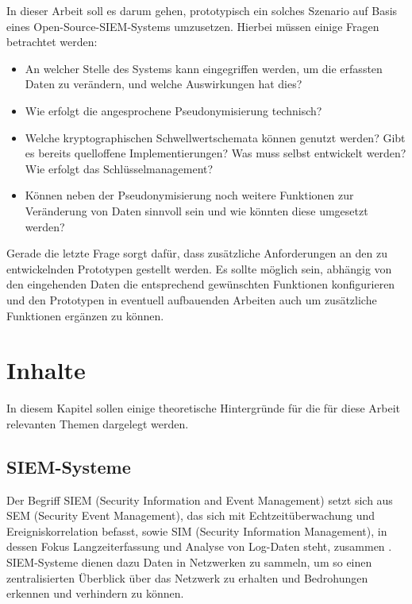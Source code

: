 \documentclass[
    fontsize=12pt,
    headings=small,
    parskip=half,           %
    bibliography=totoc,
    numbers=noenddot,       %
    open=any,               %
   final                   %
    ]{scrreprt}
\begin{document}
In dieser Arbeit soll es darum gehen, prototypisch ein solches Szenario auf Basis eines Open-Source-SIEM-Systems umzusetzen. Hierbei müssen einige Fragen betrachtet werden:

\begin{itemize}
\item An welcher Stelle des Systems kann eingegriffen werden, um die erfassten Daten zu verändern, und welche Auswirkungen hat dies?
\item Wie erfolgt die angesprochene Pseudonymisierung technisch?
\item Welche kryptographischen Schwellwertschemata können genutzt werden? Gibt es bereits quelloffene Implementierungen? Was muss selbst entwickelt werden? Wie erfolgt das Schlüsselmanagement?
\item Können neben der Pseudonymisierung noch weitere Funktionen zur Veränderung von Daten sinnvoll sein und wie könnten diese umgesetzt werden?
\end{itemize}

Gerade die letzte Frage sorgt dafür, dass zusätzliche Anforderungen an den zu entwickelnden Prototypen gestellt werden. Es sollte möglich sein, abhängig von den eingehenden Daten die entsprechend gewünschten Funktionen konfigurieren und den Prototypen in eventuell aufbauenden Arbeiten auch um zusätzliche Funktionen ergänzen zu können.


\chapter{Inhalte}

In diesem Kapitel sollen einige theoretische Hintergründe für die für diese Arbeit relevanten Themen dargelegt werden.

\section{SIEM-Systeme}

\label{sec_siem}



Der Begriff SIEM (Security Information and Event Management) setzt sich aus SEM (Security Event Management), das sich mit Echtzeitüberwachung und Ereigniskorrelation befasst, sowie SIM (Security Information Management), in dessen Fokus Langzeiterfassung und Analyse von Log-Daten steht, zusammen \cite{gartner2011}. SIEM-Systeme dienen dazu Daten in Netzwerken zu sammeln, um so einen zentralisierten Überblick über das Netzwerk zu erhalten und Bedrohungen erkennen und verhindern zu können. 
\end{document}
